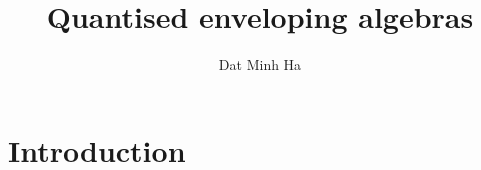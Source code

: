 

\setcounter{section}{-1}


\newcommand{\simpleroots}{\mathbb{I}}



    \title{Quantised enveloping algebras}
    
    \author{Dat Minh Ha}
    \maketitle
    
    \begin{abstract}
    
    \end{abstract}
    
    {
    \hypersetup{} 
    \tableofcontents %
    }

    \section{Introduction}

    

    

    

    

    

    
    
    \printbibliography

